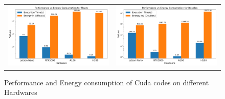 \begin{figure}[htbp]
\centering
\begin{tabular}{cc}
    \begin{minipage}{0.45\linewidth}
        \centering
        \includegraphics[width=\linewidth]{Images/cuda2.pdf}
    \end{minipage} &
    \begin{minipage}{0.45\linewidth}
        \centering
        \includegraphics[width=\linewidth]{Images/cuda1.pdf}
    \end{minipage} \\
\end{tabular}
\caption{Performance and Energy consumption of Cuda codes on different Hardwares}
\label{fig:figcudaJNRTX}
\end{figure}